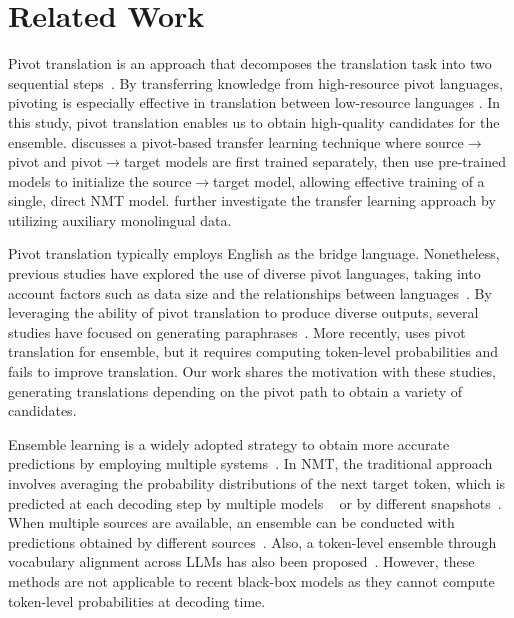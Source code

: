 \section{Related Work}
Pivot translation is an approach that decomposes the translation task into two sequential steps~\cite{wu-wang-2007-pivot, utiyama-isahara-2007-comparison}.
By transferring knowledge from high-resource pivot languages, pivoting is especially effective in translation between low-resource languages \cite{zoph-etal-2016-transfer, aji-etal-2020-neural, he-etal-2022-tencent}.
In this study, pivot translation enables us to obtain high-quality candidates for the ensemble.
\citet{kim-etal-2019-pivot} discusses a pivot-based transfer learning technique where source$\rightarrow$pivot and pivot$\rightarrow$target models are first trained separately, then use pre-trained models to initialize the source$\rightarrow$target model, allowing effective training of a single, direct NMT model.
\citet{zhang-etal-2022-triangular} further investigate the transfer learning approach by utilizing auxiliary monolingual data.


Pivot translation typically employs English as the bridge language.
Nonetheless, previous studies have explored the use of diverse pivot languages, taking into account factors such as data size and the relationships between languages~\cite{paul2009importance, dabre-etal-2015-leveraging}.
By leveraging the ability of pivot translation to produce diverse outputs, several studies have focused on generating paraphrases~\cite{mallinson-etal-2017-paraphrasing, guo2019zeroshot}.
More recently, \citet{mohammadshahi-etal-2024-investigating} uses pivot translation for ensemble, but it requires computing token-level probabilities and fails to improve translation.
Our work shares the motivation with these studies, generating translations depending on the pivot path to obtain a variety of candidates.


Ensemble learning is a widely adopted strategy to obtain more accurate predictions by employing multiple systems~\cite{sagi2018ensemble}.
In NMT, the traditional approach involves averaging the probability distributions of the next target token, which is predicted at each decoding step by multiple models ~\cite{bojar-etal-2014-findings} or by different snapshots~\cite{huang2017snapshot}.
When multiple sources are available, an ensemble can be conducted with predictions obtained by different sources~\cite {firat-etal-2016-zero}.
Also, a token-level ensemble through vocabulary alignment across LLMs has also been proposed~\cite{eva}.
However, these methods are not applicable to recent black-box models as they cannot compute token-level probabilities at decoding time.


